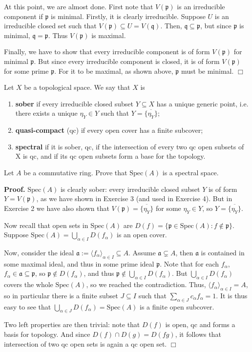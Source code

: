 \documentclass{template}
\newcommand{\qedwhite}{\hfill \ensuremath{\Box}}
\begin{document}
At this point, we are almost done. First note that $V(\mathfrak{p})$ is an
irreducible component if $\mathfrak{p}$ is minimal. Firstly, it is clearly
irreducible. Suppose $U$ is an irreducible closed set such that $V(\mathfrak{p})
\subseteq U = V(\mathfrak{q})$. Then, $\mathfrak{q} \subseteq \mathfrak{p}$, but
since $\mathfrak{p}$ is minimal, $\mathfrak{q}=\mathfrak{p}$. Thus
$V(\mathfrak{p})$ is maximal. 

Finally, we have to show that every irreducible component is of form
$V(\mathfrak{p})$ for minimal $\mathfrak{p}$. But since every irreducible
component is closed, it is of form $V(\mathfrak{p})$ for some prime
$\mathfrak{p}$. For it to be maximal, as shown above, $\mathfrak{p}$ must be
minimal. \qedwhite

\begin{problem}[Exercise 5]
    Let $X$ be a topological space. We say that $X$ is
    \begin{enumerate}
        \item \textbf{sober} if every irreducible closed subset $Y \subseteq X$
        has a unique generic point, i.e. there exists a unique $\eta_Y \in Y$
        such that $Y=\overline{\{\eta_Y\}}$;
        \item \textbf{quasi-compact} (qc) if every open cover has a finite
        subcover;
        \item \textbf{spectral} if it is sober, qc, if the intersection of every
        two qc open subsets of X is qc, and if its qc open subsets form a base
        for the topology.
    \end{enumerate}
    Let $A$ be a commutative ring. Prove that $\text{Spec}(A)$ is a spectral
    space.
\end{problem}

\textbf{Proof.} $\text{Spec}(A)$ is clearly sober: every irreducible closed
subset $Y$ is of form $Y = V(\mathfrak{p})$, as we have shown in Exercise 3 (and
used in Exercise 4). But in Exercise 2 we have also shown that $V(\mathfrak{p})
= \overline{\{\eta_Y\}}$ for some $\eta_Y \in Y$, so $Y =
\overline{\{\eta_Y\}}$.

Now recall that open sets in $\text{Spec}(A)$ are $D(f) = \{\mathfrak{p} \in
\text{Spec}(A): f \notin \mathfrak{p}\}$. Suppose $\text{Spec}(A) =
\bigcup_{\alpha \in I} D(f_{\alpha})$ is an open cover.

Now, consider the ideal $\mathfrak{a} := \langle f_{\alpha} \rangle_{\alpha \in
I} \subseteq A$. Assume $\mathfrak{a} \subsetneq A$, then $\mathfrak{a}$ is
contained in some maximal ideal, and thus in some prime ideal $\mathfrak{p}$.
Note that for each $f_{\alpha}$, $f_{\alpha} \in \mathfrak{a} \subseteq
\mathfrak{p}$, so $\mathfrak{p} \not\in D(f_{\alpha})$, and thus $\mathfrak{p}
\not\in \bigcup_{\alpha \in I}D(f_{\alpha})$. But $\bigcup_{\alpha \in
I}D(f_{\alpha})$ covers the whole $\text{Spec}(A)$, so we reached the
contradiction. Thus, $\langle f_{\alpha} \rangle_{\alpha \in I} = A$, so in
particular there is a finite subset $J \subseteq I$ such that $\sum_{\alpha \in
J} c_{\alpha}f_{\alpha} = 1$. It is thus easy to see that $\bigcup_{\alpha \in
J}D(f_{\alpha}) = \text{Spec}(A)$ is a finite open subcover. 

Two left properties are then trivial: note that $D(f)$ is open, qc and forms a
basis for topology. And since $D(f) \cap D(g) = D(fg)$, it follows that
intersection of two qc open sets is again a qc open set. \qedwhite
\end{document}
